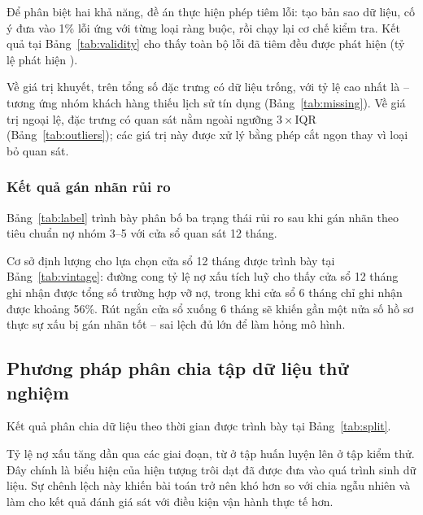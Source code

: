 Để phân biệt hai khả năng, đề án thực hiện phép tiêm lỗi: tạo bản sao dữ liệu, cố
ý đưa vào 1\% lỗi ứng với từng loại ràng buộc, rồi chạy lại cơ chế kiểm tra. Kết
quả tại Bảng~\ref{tab:validity} cho thấy toàn bộ lỗi đã tiêm đều được phát hiện
(tỷ lệ phát hiện \ValidityDetected).



Về giá trị khuyết, \NMissingVars{} trên tổng số đặc trưng có dữ liệu trống, với
tỷ lệ cao nhất là \MaxMissingPct{} -- tương ứng nhóm khách hàng thiếu lịch sử tín
dụng (Bảng~\ref{tab:missing}). Về giá trị ngoại lệ, \NOutlierVars{} đặc trưng có
quan sát nằm ngoài ngưỡng $3 \times$IQR (Bảng~\ref{tab:outliers}); các giá trị
này được xử lý bằng phép cắt ngọn thay vì loại bỏ quan sát.





\subsubsection{Kết quả gán nhãn rủi ro}
\label{subsec:kq-gan-nhan}

Bảng~\ref{tab:label} trình bày phân bố ba trạng thái rủi ro sau khi gán nhãn theo
tiêu chuẩn nợ nhóm 3--5 với cửa sổ quan sát 12 tháng.



Cơ sở định lượng cho lựa chọn cửa sổ 12 tháng được trình bày tại
Bảng~\ref{tab:vintage}: đường cong tỷ lệ nợ xấu tích luỹ cho thấy cửa sổ 12 tháng
ghi nhận được \VintageCoverage{} tổng số trường hợp vỡ nợ, trong khi cửa sổ 6
tháng chỉ ghi nhận được khoảng 56\%. Rút ngắn cửa sổ xuống 6 tháng sẽ khiến gần
một nửa số hồ sơ thực sự xấu bị gán nhãn tốt -- sai lệch đủ lớn để làm hỏng mô
hình.



\subsection{Phương pháp phân chia tập dữ liệu thử nghiệm}
\label{subsec:kq-chia-tap}

Kết quả phân chia dữ liệu theo thời gian được trình bày tại
Bảng~\ref{tab:split}.



Tỷ lệ nợ xấu tăng dần qua các giai đoạn, từ \DRTrain{}
ở tập huấn luyện lên \DRTest{} ở tập kiểm thử. Đây chính là biểu hiện của hiện
tượng trôi dạt đã được đưa vào quá trình sinh dữ liệu. Sự chênh lệch này khiến
bài toán trở nên khó hơn so với chia ngẫu nhiên và làm cho kết quả đánh giá sát
với điều kiện vận hành thực tế hơn.

